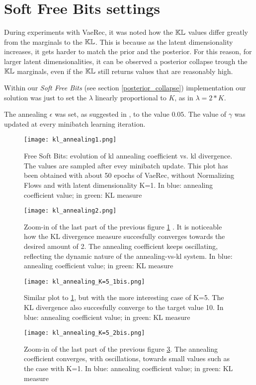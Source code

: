 \section{Soft Free Bits settings}

During experiments with VaeRec, it was noted how the $\mathbb{KL}$ values differ greatly from
the marginals to the $\mathbb{KL}$.
This is because as the latent dimensionality increases, it gets harder to match
the prior and the posterior.
For this reason, for larger latent dimensionalities,
it can be observed a posterior collapse trough the $\mathbb{KL}$ marginals,
even if the $\mathbb{KL}$ still returns values that are reasonably high.

Within our \emph{Soft Free Bits} (see section \ref{posterior_collapse}) implementation
our solution was just to set the $\lambda$ linearly proportional to $K$, as in $\lambda=2*K$.

The annealing $\epsilon$ was set, as suggested in \cite{1611.02731}, to the value $0.05$.
The value of $\gamma$ was updated at every minibatch learning iteration.

\begin{figure}[H]
\centering
\texttt{[image: kl\_annealing1.png]}
\caption{Free Soft Bits: evolution of kl annealing coefficient vs. kl divergence. The values are sampled after evey minibatch update. This plot has been obtained with about 50 epochs of VaeRec, without Normalizing Flows and with latent dimensionality K=1. In blue: annealing coefficient value; in green: KL measure}
\label{kl_annealing1}
\end{figure}


\begin{figure}[H]
\centering
\texttt{[image: kl\_annealing2.png]}
\caption{Zoom-in of the last part of the previous figure \ref{kl_annealing1} . It is noticeable how the KL divergence measure succesfully converges towards the desired amount of 2. The annealing coefficient keeps oscillating, reflecting the dynamic nature of the annealing-vs-kl system. In blue: annealing coefficient value; in green: KL measure}
\label{kl_annealing2}
\end{figure}

\begin{figure}[H]
\centering
\texttt{[image: kl\_annealing\_K=5\_1bis.png]}
\caption{Similar plot to \ref{kl_annealing1}, but with the more interesting case of K=5. The KL divergence also succesfully converge to the target value 10. In blue: annealing coefficient value; in green: KL measure}
\label{kl_annealing_K5_1}
\end{figure}

\begin{figure}[H]
\centering
\texttt{[image: kl\_annealing\_K=5\_2bis.png]}
\caption{Zoom-in of the last part of the previous figure \ref{kl_annealing_K5_1}.  The annealing coefficient converges, with oscillations, towards small values such as the case with K=1.  In blue: annealing coefficient value; in green: KL measure}
\label{kl_annealing2}
\end{figure}

